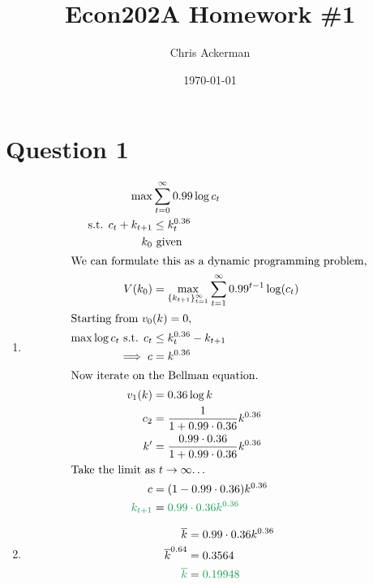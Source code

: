 \documentclass[11pt]{article}
\author{Chris Ackerman}
\date{\today}
\title{Econ202A Homework \#1}
\newcommand{\gr}{\textcolor{ForestGreen}}
\begin{document}
\maketitle
\tableofcontents

\newpage

\section{Question 1}
\label{sec:org3f800b4}

\begin{enumerate}[label=(\alph*)]
\item
\begin{align*}
\max &\sum^\infty_{t = 0} 0.99 \log c_t \\
\text{s.t. } c_t + k_{t + 1} &\le k_t^{0.36}\\
k_0 & \text{ given}\\
\intertext{We can formulate this as a dynamic programming problem,}
V(k_0) &= \max_{\{k_{t + 1}\}^\infty_{t = 1}} \sum^\infty_{t = 1} 0.99^{t - 1} \log(c_t)\\
\intertext{Starting from $v_0(k) = 0$,}
\max \log c_t \text{ s.t. } c_t &\le k^{0.36}_t - k_{t + 1}\\
\implies c &= k^{0.36}\\
\intertext{Now iterate on the Bellman equation.}
v_1(k) &= 0.36 \log k\\
c_2 &= \frac{1}{1 + 0.99 \cdot 0.36} k^{0.36}\\
k' &= \frac{0.99 \cdot 0.36}{1 + 0.99 \cdot 0.36} k^{0.36}\\
\intertext{Take the limit as $t \to \infty$\ldots}
c &= (1 - 0.99 \cdot 0.36)k^{0.36}\\
\gr{k_{t + 1}} &= \gr{0.99 \cdot 0.36 k^{0.36}}
\end{align*}
\item
\begin{align*}
\overline{k} &= 0.99 \cdot 0.36 k^{0.36}\\
\overline{k}^{0.64} &= 0.3564\\
\gr{\overline{k}} &= \gr{0.19948}
\end{align*}
\end{enumerate}
\end{document}
